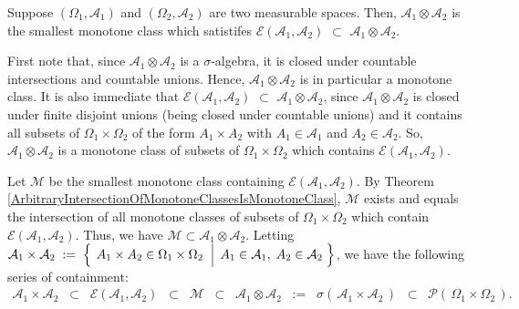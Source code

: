 \begin{theorem}
\mbox{}\vskip0.1cm\noindent
Suppose
$\left(\Omega_{1},\mathcal{A}_{1}\right)$ and $\left(\Omega_{2},\mathcal{A}_{2}\right)$
are two measurable spaces.\;
Then, $\mathcal{A}_{1}\otimes\mathcal{A}_{2}$ is the smallest monotone class which satistifes
$\mathcal{E}\!\left(\mathcal{A}_{1},\mathcal{A}_{2}\right)$
$\subset$
$\mathcal{A}_{1}\otimes\mathcal{A}_{2}$.
\end{theorem}
\proof
First note that, since $\mathcal{A}_{1}\otimes\mathcal{A}_{2}$ is a $\sigma$-algebra,
it is closed under countable intersections and countable unions.
Hence, $\mathcal{A}_{1}\otimes\mathcal{A}_{2}$ is in particular a monotone class.
It is also immediate that
$\mathcal{E}\!\left(\mathcal{A}_{1},\mathcal{A}_{2}\right)$
$\subset$
$\mathcal{A}_{1}\otimes\mathcal{A}_{2}$,
since 
$\mathcal{A}_{1}\otimes\mathcal{A}_{2}$ is closed under finite disjoint unions
(being closed under countable unions) and
it contains all subsets of $\Omega_{1}\times\Omega_{2}$ of the form
$A_{1}\times A_{2}$ with $A_{1} \in \mathcal{A}_{1}$ and $A_{2}\in\mathcal{A}_{2}$.
So, $\mathcal{A}_{1}\otimes\mathcal{A}_{2}$ is a monotone class of subsets
of $\Omega_{1}\times\Omega_{2}$ which contains
$\mathcal{E}\!\left(\mathcal{A}_{1},\mathcal{A}_{2}\right)$.

\vskip 0.3cm
\noindent
Let $\mathcal{M}$ be the smallest monotone class containing
$\mathcal{E}\!\left(\mathcal{A}_{1},\mathcal{A}_{2}\right)$.
By Theorem \ref{ArbitraryIntersectionOfMonotoneClassesIsMonotoneClass},
$\mathcal{M}$ exists and equals the intersection of all monotone classes of subsets
of $\Omega_{1}\times\Omega_{2}$ which contain
$\mathcal{E}\!\left(\mathcal{A}_{1},\mathcal{A}_{2}\right)$.
Thus, we have $\mathcal{M} \subset \mathcal{A}_{1}\otimes\mathcal{A}_{2}$.
Letting
$
\mathcal{A}_{1} \times \mathcal{A}_{2} \; := \;
	\left\{\;
	\left.
	A_{1} \times A_{2} \overset{{\color{white}.}}{\in} \Omega_{1} \times \Omega_{2}
	\;\;\right\vert\;
	A_{1} \in \mathcal{A}_{1},\;
	A_{2} \in \mathcal{A}_{2}
	\;\right\}
$,
we have the following series of containment:
\begin{eqnarray*}
\mathcal{A}_{1} \times \mathcal{A}_{2}
\;\; \subset \;\; \mathcal{E}\!\left(\mathcal{A}_{1},\mathcal{A}_{2}\right)
\;\; \subset \;\; \mathcal{M}
\;\; \subset \;\; \mathcal{A}_{1}\otimes\mathcal{A}_{2}
\;\; := \;\; \sigma\!\left(\, \mathcal{A}_{1} \times \mathcal{A}_{2} \,\right)
\;\; \subset \;\; \mathcal{P}\!\left(\,\Omega_{1}\times\Omega_{2}\,\right).
\end{eqnarray*}

